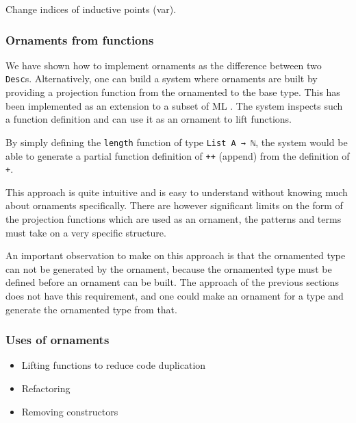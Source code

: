Change indices of inductive points (var).

\subsubsection{Ornaments from functions}

We have shown how to implement ornaments as the difference between two
\texttt{Desc}s.
Alternatively, one can build a system where ornaments are built by
providing a projection function from the ornamented to the base type.
This has been implemented as an extension to a subset of ML
\cite{williams14}.
The system inspects such a function definition and can use it as an
ornament to lift functions.

\begin{example}
By simply defining the \texttt{length} function of type \texttt{List A
  → ℕ}, the system would be able to generate a partial function
definition of \texttt{++} (append) from the definition of \texttt{+}.
\end{example}

This approach is quite intuitive and is easy to understand without
knowing much about ornaments specifically.
There are however significant limits on the form of the projection
functions which are used as an ornament, the patterns and terms must
take on a very specific structure.

An important observation to make on this approach is that the
ornamented type can not be generated by the ornament, because the
ornamented type must be defined before an ornament can be built.
The approach of the previous sections does not have this requirement,
and one could make an ornament for a type and generate the ornamented
type from that.

\subsubsection{Uses of ornaments}


\begin{itemize}
\item Lifting functions to reduce code duplication
\item Refactoring
\item Removing constructors
\end{itemize}

\cite{williams14}
